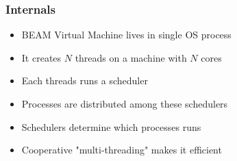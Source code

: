 \begin{frame}
    \frametitle{Internals}
    \begin{itemize}
        \item BEAM Virtual Machine lives in single OS process
        \item It creates $N$ threads on a machine with $N$ cores
        \item Each threads runs a scheduler
        \item Processes are distributed among these schedulers
        \item Schedulers determine which processes runs
        \item Cooperative "multi-threading" makes it efficient
    \end{itemize}
\end{frame}
